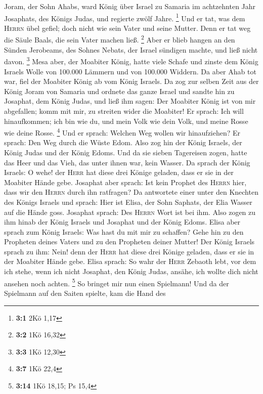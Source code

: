  Joram, der Sohn Ahabs, ward König über Israel zu Samaria
im achtzehnten Jahr Josaphats, des Königs Judas, und regierte zwölf
Jahre. \footnote{\textbf{3:1} 2Kö 1,17}  Und er tat, was
dem \textsc{Herrn} übel gefiel; doch nicht wie sein Vater und seine
Mutter. Denn er tat weg die Säule Baals, die sein Vater machen ließ.
\footnote{\textbf{3:2} 1Kö 16,32}  Aber er blieb hangen an
den Sünden Jerobeams, des Sohnes Nebats, der Israel sündigen machte, und
ließ nicht davon. \footnote{\textbf{3:3} 1Kö 12,30}  Mesa
aber, der Moabiter König, hatte viele Schafe und zinste dem König
Israels Wolle von 100.000 Lämmern und von 100.000 Widdern.
 Da aber Ahab tot war, fiel der Moabiter König ab vom
König Israels.  Da zog zur selben Zeit aus der König Joram
von Samaria und ordnete das ganze Israel  und sandte hin
zu Josaphat, dem König Judas, und ließ ihm sagen: Der Moabiter König ist
von mir abgefallen; komm mit mir, zu streiten wider die Moabiter! Er
sprach: Ich will hinaufkommen; ich bin wie du, und mein Volk wie dein
Volk, und meine Rosse wie deine Rosse. \footnote{\textbf{3:7} 1Kö 22,4}
 Und er sprach: Welchen Weg wollen wir hinaufziehen? Er
sprach: Den Weg durch die Wüste Edom.  Also zog hin der
König Israels, der König Judas und der König Edoms. Und da sie sieben
Tagereisen zogen, hatte das Heer und das Vieh, das unter ihnen war, kein
Wasser.  Da sprach der König Israels: O wehe! der
\textsc{Herr} hat diese drei Könige geladen, dass er sie in der Moabiter
Hände gebe.  Josaphat aber sprach: Ist kein Prophet des
\textsc{Herrn} hier, dass wir den \textsc{Herrn} durch ihn ratfragen? Da
antwortete einer unter den Knechten des Königs Israels und sprach: Hier
ist Elisa, der Sohn Saphats, der Elia Wasser auf die Hände goss.
 Josaphat sprach: Des \textsc{Herrn} Wort ist bei ihm.
Also zogen zu ihm hinab der König Israels und Josaphat und der König
Edoms.  Elisa aber sprach zum König Israels: Was hast du
mit mir zu schaffen? Gehe hin zu den Propheten deines Vaters und zu den
Propheten deiner Mutter! Der König Israels sprach zu ihm: Nein! denn der
\textsc{Herr} hat diese drei Könige geladen, dass er sie in der Moabiter
Hände gebe.  Elisa sprach: So wahr der \textsc{Herr}
Zebaoth lebt, vor dem ich stehe, wenn ich nicht Josaphat, den König
Judas, ansähe, ich wollte dich nicht ansehen noch achten. \footnote{\textbf{3:14}
  1Kö 18,15; Ps 15,4}  So bringet mir nun einen
Spielmann! Und da der Spielmann auf den Saiten spielte, kam die Hand des
